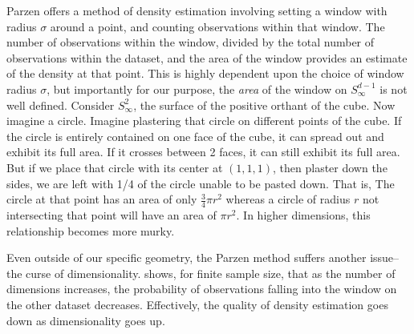 Parzen \cite{parzen1962} offers a method of density estimation involving setting a window with
  radius $\sigma$ around a point, and counting observations within that window.  The number of
  observations within the window, divided by the total number of observations within the dataset,
  and the area of the window provides an estimate of the density at that point. This is highly
  dependent upon the choice of window radius $\sigma$, but importantly for our purpose, the
  \emph{area} of the window on $S_{\infty}^{d-1}$ is not well defined.  Consider $S_{\infty}^{2}$,
  the surface of the positive orthant of the cube.  Now imagine a circle.  Imagine plastering that
  circle on different points of the cube.  If the circle is entirely contained on one face of the
  cube, it can spread out and exhibit its full area.  If it crosses between 2 faces, it can still
  exhibit its full area. But if we place that circle with its center at $(1,1,1)$, then plaster down
  the sides, we are left with 1/4 of the circle unable to be pasted down.  That is, The circle at
  that point has an area of only $\frac{3}{4}\pi r^2$ whereas a circle of radius $r$ not
  intersecting that point will have an area of $\pi r^2$.  In higher dimensions, this relationship
  becomes more murky.

Even outside of our specific geometry, the Parzen method suffers another issue--the curse of
  dimensionality.  \cite{boltz2009} shows, for finite sample size, that as the number of dimensions
  increases, the probability of observations falling into the window on the other dataset decreases.
  Effectively, the quality of density estimation goes down as dimensionality goes up.

